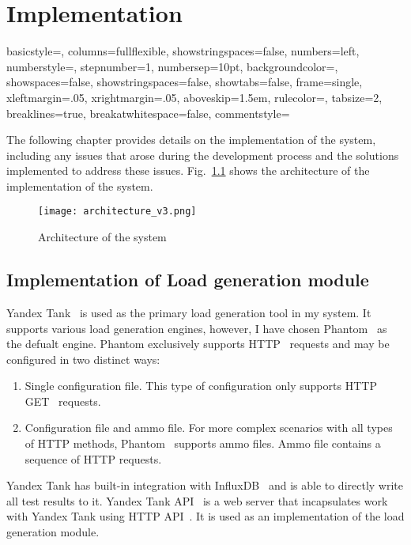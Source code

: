\usepackage{color}\chapter{Implementation}
\label{ch:impl}


\newcommand{\code}[1]{\colorbox{light-gray}{\texttt{#1}}}
 {
    basicstyle=\small,
    columns=fullflexible,
    showstringspaces=false,
    numbers=left,
    numberstyle=\color{gray}\small,
    stepnumber=1,
    numbersep=10pt,
    backgroundcolor=\color{white},
    showspaces=false,
    showstringspaces=false,
    showtabs=false,
    frame=single,
    xleftmargin=.05\textwidth,
    xrightmargin=.05\textwidth,
    aboveskip=1.5em,
    rulecolor=\color{black},
    tabsize=2,
    breaklines=true,
    breakatwhitespace=false,
    commentstyle=\color{gray}\upshape
}

\lstset{style=CodeStyle}


The following chapter provides details on the implementation of the system, including any issues that arose during the development process and the solutions implemented to address these issues.
Fig.~\ref{fig:architecture} shows the architecture of the implementation of the system.

\begin{figure}[t]
    \centering
    \texttt{[image: architecture\_v3.png]}
    \caption{Architecture of the system}
    \label{fig:architecture}
\end{figure}

\section{Implementation of Load generation module}\label{sec:yandex_tank_use}
Yandex Tank~\cite{yandex_tank} is used as the primary load generation tool in my system. It supports various load generation engines, however, I have chosen Phantom~\cite{phantom} as the defualt engine. Phantom exclusively supports HTTP~\cite{http} requests and may be configured in two distinct ways:
\begin{enumerate}
    \item Single configuration file. This type of configuration only supports HTTP GET~\cite{http} requests.
    \item Configuration file and ammo file. For more complex scenarios with all types of HTTP methods, Phantom~\cite{phantom} supports ammo files. Ammo file contains a sequence of HTTP requests.
\end{enumerate}
Yandex Tank has built-in integration with InfluxDB~\cite{influxdb} and is able to directly write all test results to it.
Yandex Tank API~\cite{yandex_tank_api} is a web server that incapsulates work with Yandex Tank using HTTP API~\cite{microservices}. It is used as an implementation of the load generation module.


